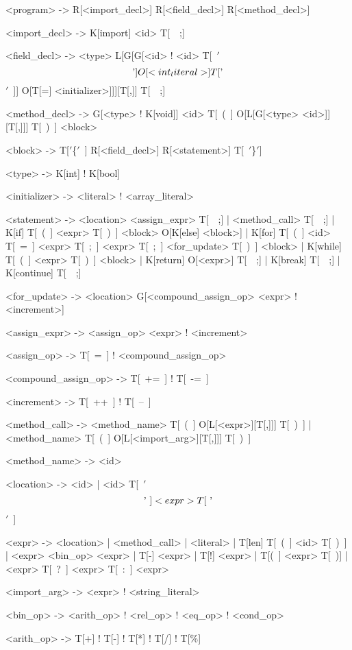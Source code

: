 \documentclass[11pt]{article}
\begin{document}
\begin{bnfgrammar}
<program> -> R[<import_decl>] R[<field_decl>] R[<method_decl>]

<import_decl> -> K[import] <id> T[~~;]

<field_decl> -> <type> L[G[G[<id> ! <id> T[~$'$\[$'$] O[<int_literal>] T[$'$\]$'$~]] O[T[=] <initializer>]]][T[,]] T[~~;]

<method_decl> -> G[<type> ! K[void]] <id> T[~(~] O[L[G[<type> <id>]][T[,]]] T[~)~] <block>

<block> -> T[$'$\{$'$~] R[<field_decl>]  R[<statement>] T[~$'$\}$'$]

<type> -> K[int] ! K[bool]

<initializer> -> <literal> ! <array_literal>

<statement> -> <location> <assign_expr> T[~~;]
             | <method_call> T[~~;]
             | K[if] T[~(~] <expr> T[~)~] <block> O[K[else] <block>]
             | K[for] T[~(~] <id> T[~=~] <expr> T[~;~] <expr> T[~;~] <for_update> T[~)~] <block>
             | K[while] T[~(~] <expr> T[~)~] <block>
             | K[return] O[<expr>] T[~~;]
             | K[break] T[~~;]
             | K[continue] T[~~;]

<for_update> -> <location> G[<compound_assign_op> <expr> ! <increment>]

<assign_expr> -> <assign_op> <expr> ! <increment>

<assign_op> -> T[~=~] ! <compound_assign_op>

<compound_assign_op> -> T[~+=~] ! T[~-=~]

<increment> -> T[~++~] ! T[~--~]

<method_call> -> <method_name> T[~(~] O[L[<expr>][T[,]]] T[~)~]
        |        <method_name> T[~(~] O[L[<import_arg>][T[,]]] T[~)~]

<method_name> -> <id>

<location> -> <id>
            | <id> T[~$'$\[$'$~] <expr> T[~$'$\]$'$~]

<expr> -> <location>
        | <method_call>
        | <literal>
        | T[len] T[~(~] <id> T[~)~]
        | <expr> <bin_op> <expr>
        | T[-] <expr>
        | T[!] <expr>
        | T[(~] <expr> T[~)]
        | <expr> T[~?~] <expr> T[~:~] <expr>

<import_arg> -> <expr> ! <string_literal>

<bin_op> -> <arith_op> ! <rel_op> ! <eq_op> ! <cond_op>

<arith_op> -> T[+] ! T[-] ! T[*] ! T[/] ! T[\%]


\end{bnfgrammar}
\end{document}
